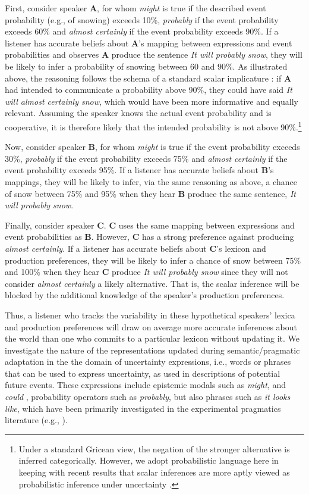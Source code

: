 \documentclass[man, floatsintext]{apa6}
\begin{document}
First, consider speaker {\bf A}, for whom \textit{might} is true if the described event probability (e.g., of snowing) exceeds 10\%, 
\textit{probably} if the event probability exceeds 60\% and \textit{almost certainly}  if the event probability exceeds 90\%.  If a listener has accurate beliefs about {\bf A}'s mapping between expressions and event probabilities and observes {\bf A}  produce the sentence \emph{It will probably snow}, they will be likely to infer a probability of snowing between 60 and 90\%. As illustrated above, the reasoning follows the schema of a standard scalar implicature \parencite{Grice1975, Horn1984}: if  {\bf A} had intended to communicate a probability above 90\%, they could have said \emph{It will almost certainly snow}, which would have been more informative and equally relevant. Assuming the speaker knows the actual event probability and is cooperative, it is therefore likely that the intended probability is not above 90\%.\footnote{Under a standard Gricean view, the negation of the stronger alternative is inferred categorically. However, we adopt probabilistic language here in keeping with recent results that scalar inferences are more aptly viewed as probabilistic inference under uncertainty \parencite{Goodman2013}.} 

Now, consider speaker {\bf B}, for whom \textit{might} is true if the event probability exceeds 30\%, 
\textit{probably} if the event probability exceeds 75\% and \textit{almost certainly}  if the event probability exceeds 95\%. If a listener has
accurate beliefs about {\bf B}'s mappings, they will be likely to infer, via the same reasoning as above, a chance of snow between 75\% and 95\% when they hear {\bf B} produce the same sentence, \textit{It will probably snow}.

Finally, consider speaker {\bf C}. {\bf C} uses the same mapping between expressions and event probabilities as {\bf B}. However, {\bf C} has a strong preference against 
producing \textit{almost certainly}. If a listener has accurate beliefs about {\bf C}'s lexicon and production preferences, 
they will be likely to infer a chance of snow between 75\% and 100\% when they hear {\bf C} produce \textit{It will probably snow} since they will not
consider  \textit{almost certainly} a likely alternative. That is, the scalar inference will be blocked by the additional knowledge of the speaker's production preferences. 

Thus, a listener who tracks the variability in these hypothetical speakers' lexica and production preferences will draw on average more accurate inferences about the world than one who commits to a particular lexicon without updating it. We investigate the nature of the representations updated during semantic/pragmatic adaptation in the the domain of uncertainty expressions, i.e., words or phrases that can be used to express uncertainty, as used in descriptions of potential future events. These expressions include epistemic modals such as \textit{might}, 
and \textit{could} \parencite[see, for example,][]{Kratzer1991,Hacquard2011}, probability operators such as \textit{probably}, but also phrases such as \textit{it looks like}, which have been primarily investigated in the experimental pragmatics literature (e.g., \cite{Kurumada2014,Pogue2018}).
\end{document}
